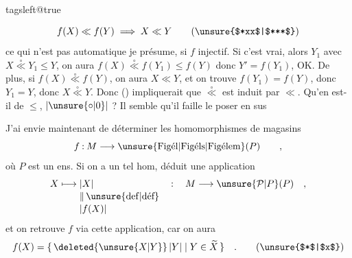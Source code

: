 \begingroup\csname tagsleft@true\endcsname

\[
 f(X)\ll f(Y)\implies X\ll Y \tag*{(\unsure{$*xx$|$***$})}
\]
ce qui n'est pas automatique je présume,  si $f$ injectif. Si c'est vrai, alors  $Y_1$ avec $X\mathrel{\overset{\circ}{\ll}}Y_1\leq Y$, on aura $f(X)\mathrel{\overset{\circ}{\ll}}f(Y_1)\leq f(Y)$ donc $Y'=f(Y_1)$, OK. De plus, si $f(X)\mathrel{\overset{\circ}{\ll}}f(Y)$, on aura $X\ll Y$, et   on trouve $f(Y_1)=f(Y)$, donc $Y_1=Y$, donc $X\mathrel{\overset{\circ}{\ll}}Y$. Donc () impliquerait que $\mathrel{\overset{\circ}{\ll}}$ est induit par $\ll$. Qu'en est-il de $\leq$, $|\unsure{\circ|0}|$ ? Il semble qu'il faille le poser en sus


J'ai envie maintenant de déterminer les homomorphismes de magasins
\[
 f\mathbin{:}M\longrightarrow\unsure{\text{Figél}|\text{Figéls}|\text{Figélem}}(P)\qquad ,
\]
où $P$ est un ens. Si on a un tel hom,   déduit une application
\[
 \begin{aligned}
 X\longmapsto{} & |X| &&\mathbin{:}\quad M\longrightarrow\unsure{\mathcal P|P}(P)\quad ,\\[-2pt]
 & \Vert\,\unsure{\mathrm{def}|\text{déf}}\\[-2pt]
 & |f(X)|
 \end{aligned}
\]
et on retrouve $f$ via cette application, car on aura
\[
 f(X)=\{\,\deleted{\unsure{X|Y}}\,|Y|\mid Y\in\widetilde X\,\}\quad . \tag*{(\unsure{$*$|$x$})}
\]
\endgroup
